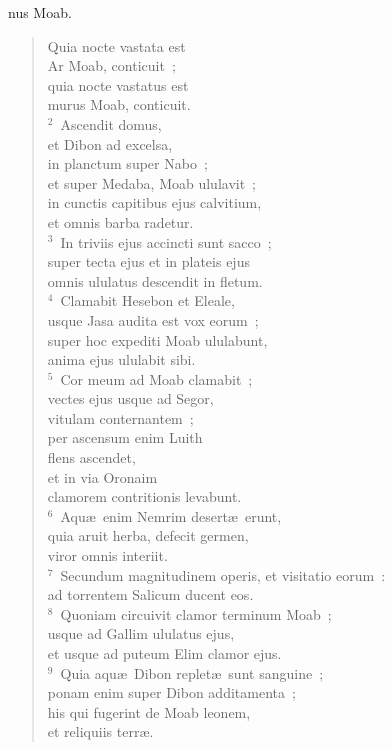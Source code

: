 \bchapter
{}nus Moab. \begin{verse}Quia nocte vastata est\\ Ar Moab, conticuit~;\\ quia nocte vastatus est\\ murus Moab, conticuit.\\
${}^{2}$~Ascendit domus,\\ et Dibon ad excelsa,\\ in planctum super Nabo~;\\ et super Medaba, Moab ululavit~;\\ in cunctis capitibus ejus calvitium,\\ et omnis barba radetur.\\
${}^{3}$~In triviis ejus accincti sunt sacco~;\\ super tecta ejus et in plateis ejus\\ omnis ululatus descendit in fletum.\\
${}^{4}$~Clamabit Hesebon et Eleale,\\ usque Jasa audita est vox eorum~;\\ super hoc expediti Moab ululabunt,\\ anima ejus ululabit sibi.\\
${}^{5}$~Cor meum ad Moab clamabit~;\\ vectes ejus usque ad Segor,\\ vitulam conternantem~;\\ per ascensum enim Luith\\ flens ascendet,\\ et in via Oronaim\\ clamorem contritionis levabunt.\\
${}^{6}$~Aqu\ae\ enim Nemrim desert\ae\ erunt,\\ quia aruit herba, defecit germen,\\ viror omnis interiit.\\
${}^{7}$~Secundum magnitudinem operis, et visitatio eorum~:\\ ad torrentem Salicum ducent eos.\\
${}^{8}$~Quoniam circuivit clamor terminum Moab~;\\ usque ad Gallim ululatus ejus,\\ et usque ad puteum Elim clamor ejus.\\
${}^{9}$~Quia aqu\ae\ Dibon replet\ae\ sunt sanguine~;\\ ponam enim super Dibon additamenta~;\\ his qui fugerint de Moab leonem,\\ et reliquiis terr\ae .\end{verse}


